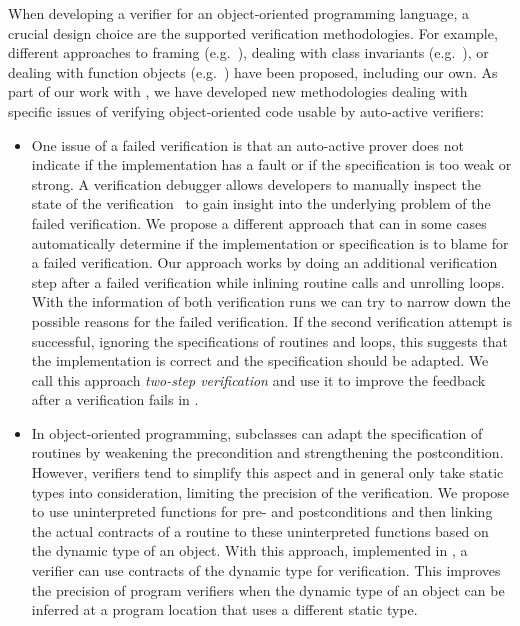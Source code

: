 When developing a verifier for an object-oriented programming language, a crucial design choice are the supported verification methodologies.
For example, different approaches to framing (e.g.~\cite{REYNOLDS02,KASSIOS06}), dealing with class invariants (e.g.~\cite{BARNETT04,LEINO04,POLIKARPOVA14}), or dealing with function objects (e.g.~\cite{MUELLER09,NORDIO10}) have been proposed, including our own.
As part of our work with \AutoProof, we have developed new methodologies dealing with specific issues of verifying object-oriented code usable by auto-active verifiers:
\begin{itemize}
\item
One issue of a failed verification is that an auto-active prover does not indicate if the implementation has a fault or if the specification is too weak or strong.
A verification debugger allows developers to manually inspect the state of the verification~\cite{GOUES11} to gain insight into the underlying problem of the failed verification.
We propose a different approach that can in some cases automatically determine if the implementation or specification is to blame for a failed verification.
Our approach works by doing an additional verification step after a failed verification while inlining routine calls and unrolling loops.
With the information of both verification runs we can try to narrow down the possible reasons for the failed verification.
If the second verification attempt is successful, ignoring the specifications of routines and loops, this suggests that the implementation is correct and the specification should be adapted. We call this approach \emph{two-step verification} and use it to improve the feedback after a verification fails in \AutoProof.

\item
In object-oriented programming, subclasses can adapt the specification of routines by weakening the precondition and strengthening the postcondition.
However, verifiers tend to simplify this aspect and in general only take static types into consideration, limiting the precision of the verification.
We propose to use uninterpreted functions for pre- and postconditions and then linking the actual contracts of a routine to these uninterpreted functions based on the dynamic type of an object. With this approach, implemented in \AutoProof, a verifier can use contracts of the dynamic type for verification. This improves the precision of program verifiers when the dynamic type of an object can be inferred at a program location that uses a different static type.


\end{itemize}
